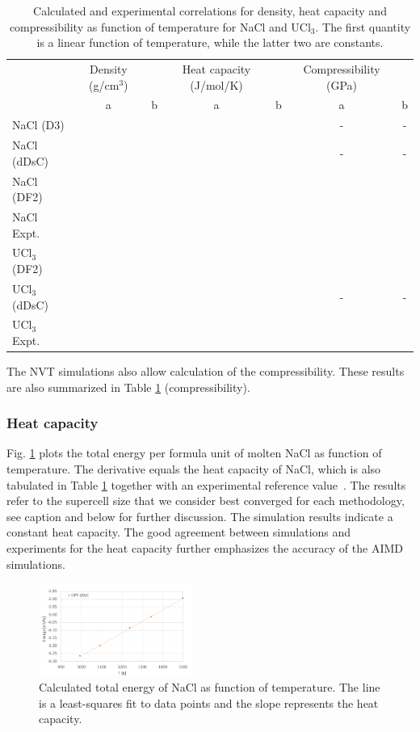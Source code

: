 \documentclass[preprint,3p,10pt,twocolumn,number,sort&compress]{elsarticle}
\begin{document}
\begin{table}[hb!]
\centering
\begin{tabular}{lcccccc}
\hline
\hline
& Density (g/cm$^3$) & &Heat capacity (J/mol/K) & &Compressibility (GPa) &\\
&a &b &a &b &a &b \\
\hline
NaCl (D3)	& & & & & - & - \\
NaCl (dDsC)	& & & & & - & - \\
NaCl (DF2)	& & & & & & \\
NaCl Expt.	& & & & & & \\
UCl$_3$ (DF2) & & & & & & \\	
UCl$_3$ (dDsC) & & & & & - & - \\	
UCl$_3$ Expt.	& & & & & & \\
\hline
\hline
\end{tabular}
\caption{Calculated and experimental correlations for density, heat capacity and compressibility as function of temperature for NaCl and UCl$_3$. The first quantity is a linear function of temperature, while the latter two are constants.}
\label{table:NaCldensityetc}
\end{table}

The NVT simulations also allow calculation of the compressibility. These results are also summarized in Table \ref{table:NaCldensityetc} (compressibility). %

\subsubsection{Heat capacity} 
Fig. \ref{fig:NaClheatc} plots the total energy per formula unit of molten NaCl as function of temperature. The derivative equals the heat capacity of NaCl, which is also tabulated in Table \ref{table:NaCldensityetc} together with an experimental reference value~\cite{}. The results refer to the supercell size that we consider best converged for each methodology, see caption and below for further discussion. The simulation results indicate a constant heat capacity. The good agreement between simulations and experiments for the heat capacity further emphasizes the accuracy of the AIMD simulations.  

\begin{figure}[htb]
\centering
\includegraphics[width=0.45\textwidth]{./figures/FIG3.pdf}
\caption{Calculated total energy of NaCl as function of temperature. The line is a least-squares fit to data points and the slope represents the heat capacity.} 
\label{fig:NaClheatc}
\end{figure}
\end{document}
